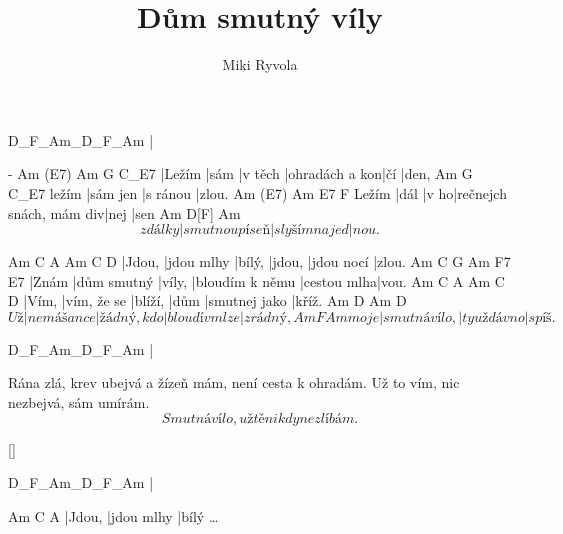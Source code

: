 \documentclass{song}
\title{Dům smutný víly}
\author{Miki Ryvola}
\begin{document}
\strophe
D_F_Am_D_F_Am
|
\endstrophe

\strophe
-      Am   (E7)    Am             G   C_E7
|Ležím |sám |v těch |ohradách a kon|čí |den,
      Am       G        C_E7
ležím |sám jen |s ránou |zlou.
      Am   (E7) Am                      E7   F
Ležím |dál |v ho|rečnejch snách, mám div|nej |sen
        Am             D[F]         Am
\[ z dálky |smutnou píseň |slyším najed|nou. \]
\endstrophe

Am     C          A      Am     C          D
|Jdou, |jdou mlhy |bílý, |jdou, |jdou nocí |zlou.
Am    C           G      Am              F7          E7
|Znám |dům smutný |víly, |bloudím k němu |cestou mlha|vou.
Am    C           A       Am   C             D
|Vím, |vím, že se |blíží, |dům |smutnej jako |kříž.
      Am          D           Am             D
\[ Už |nemá šance |žádný, kdo |bloudí v mlze |zrádný,
     Am            F            Am
moje |smutná vílo, |ty už dávno |spíš. \]
\endstrophe

\strophe
D_F_Am_D_F_Am
|
\endstrophe

\strophe*
Rána zlá, krev ubejvá a žízeň mám,
není cesta k ohradám.
Už to vím, nic nezbejvá, sám umírám.
\[ Smutná vílo, už tě nikdy nezlíbám. \]
\endstrophe

\ref{}

\strophe
D_F_Am_D_F_Am
|
\endstrophe

\strophe
Am     C          A
|Jdou, |jdou mlhy |bílý \ldots{}
\endstrophe
\end{document}

